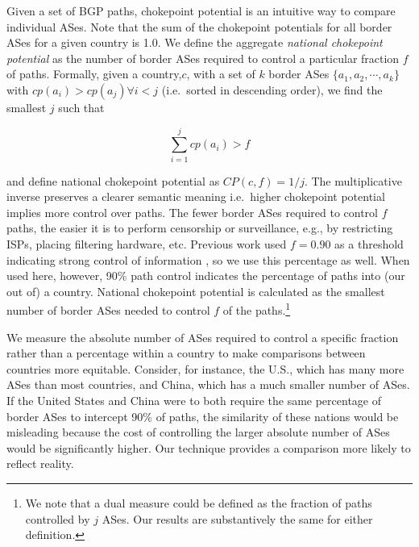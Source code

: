 Given a set of BGP paths, chokepoint potential is an intuitive way to
compare individual ASes. Note that the sum of the chokepoint potentials
for all border ASes for a given country is 1.0.
We define the aggregate \emph{national chokepoint potential} as the number of
border ASes required to control a particular fraction $f$ of paths. Formally,
given a country,$c$, with a set of $k$ border ASes $\{a_1,a_2,\cdots,a_k\}$ with
$cp(a_i)>cp(a_j) \forall i<j$ (i.e.\ sorted in descending order), we find the smallest $j$ such that 

\begin{equation}
  \label{eq:nationalchokepoint}
  \sum_{i=1}^j cp(a_i) > f
\end{equation}

and define national chokepoint potential as $CP(c,f) = 1/j$. The
multiplicative inverse preserves a clearer semantic meaning i.e.\ higher
chokepoint potential implies more control over paths. The fewer border ASes
required to control $f$ paths, the easier it is to perform
censorship or surveillance, e.g., by restricting ISPs,
placing filtering hardware, etc. 
Previous work used $f=0.90$ as a threshold indicating strong control of information
\cite{throats}, so we use this percentage as well. When used here, however,
90\% path control indicates the percentage of paths into (our out of) a country.
National chokepoint potential is calculated
as the smallest number of
border ASes needed to control $f$ of the paths.\footnote{We note that a dual measure
could be defined as the fraction of paths controlled by $j$ ASes. Our results
are substantively the same for either definition.}

We measure the absolute number of ASes required to control a specific
fraction rather than a percentage within a country to make
comparisons between countries more equitable.
Consider, for instance, the U.S., which has many more ASes than
most countries, and China, which has a much smaller number of ASes. If the United States and China 
were to both require the same
percentage of border ASes to intercept 90\% of paths, the similarity of these
nations would be misleading because the cost of controlling the larger absolute number of ASes
would be significantly higher. Our technique provides a comparison more likely to
reflect reality. 
